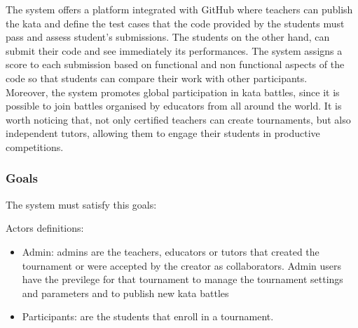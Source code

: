 \documentclass{article}
\begin{document}
        The system offers a platform integrated with GitHub where teachers can publish the kata and define the test cases that the code provided by the students must pass and assess student's submissions.
        The students on the other hand, can submit their code and see immediately
        its performances. The system assigns a score to each submission
        based on functional and non functional aspects of the code so that
        students can compare their work with other participants.\\
        
        Moreover, the system promotes global participation in kata battles, since it is possible to join battles organised by educators from all around the world.
        It is worth noticing that, not only certified teachers can create tournaments, but also independent tutors, allowing them to engage their students in productive competitions. 
        
            \subsubsection{Goals}
                The system must satisfy this goals:

                Actors definitions:
                \begin {itemize}
                    \item Admin: admins are the teachers, educators or tutors that created the tournament or were accepted by the creator as collaborators. Admin users have the previlege for that tournament to manage the tournament settings and parameters and to publish new kata battles
                    \item Participants: are the students that enroll in a tournament. 
                \end {itemize}
\end{document}
